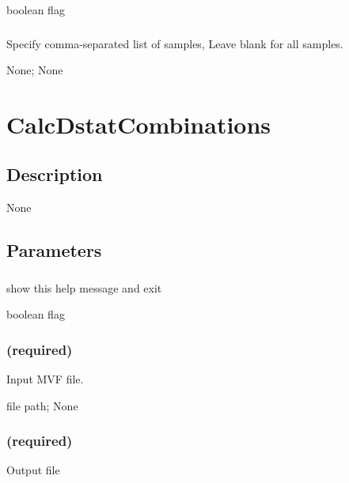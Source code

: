\documentclass[letterpaper,11pt,english]{sphinxmanual}
\begin{document}
 boolean flag


\subsubsection{}
\label{\detokenize{prog_desc:id45}}
 Specify comma-separated list of samples, Leave blank for all samples.

 None;  None


\section{CalcDstatCombinations}
\label{\detokenize{prog_desc:calcdstatcombinations}}

\subsection{Description}
\label{\detokenize{prog_desc:id46}}
None


\subsection{Parameters}
\label{\detokenize{prog_desc:id47}}

\subsubsection{}
\label{\detokenize{prog_desc:id48}}
 show this help message and exit

 boolean flag


\subsubsection{ (required)}
\label{\detokenize{prog_desc:id49}}
 Input MVF file.

 file path;  None


\subsubsection{ (required)}
\label{\detokenize{prog_desc:id50}}
 Output file
\end{document}
